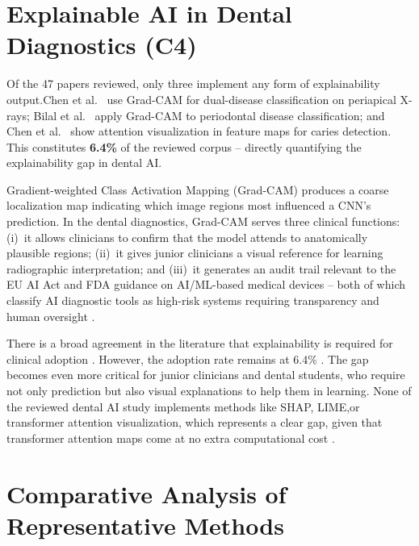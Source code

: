 \documentclass[conference]{IEEEtran}
\begin{document}
\section{Explainable AI in Dental Diagnostics (C4)}
\label{sec:xai}

Of the 47 papers reviewed, only three implement any form of explainability output.Chen et al.~\cite{chen2023deep} use Grad-CAM for dual-disease
classification on periapical X-rays; Bilal et al.~\cite{bilal2024pdcnet}
apply Grad-CAM to periodontal disease classification; and Chen et
al.~\cite{chen2024cariesxrays} show attention visualization in feature
maps for caries detection. This constitutes \textbf{6.4\%} of the
reviewed corpus -- directly quantifying the explainability gap in dental
AI.

Gradient-weighted Class Activation Mapping (Grad-CAM) produces a coarse localization map indicating which image regions most influenced a CNN’s prediction. In the dental diagnostics, Grad-CAM serves three clinical functions:  (i)~it allows clinicians to confirm that the model
attends to anatomically plausible regions; (ii)~it gives junior clinicians a visual reference for learning radiographic interpretation;
and (iii)~it generates an audit trail relevant to the EU AI Act and FDA
guidance on AI/ML-based medical devices -- both of which classify AI
diagnostic tools as high-risk systems requiring transparency and human
oversight \cite{chen2023deep}.

 There is a broad agreement in the literature that explainability is required for clinical adoption
\cite{nassiri2025yolo,gamal2025automated,sastika2025ai,ferrara2025applications}. However, the adoption rate remains at
 6.4\% . The gap becomes even more critical for junior clinicians and dental students, who require not only prediction but also visual explanations to help them in learning. None of the reviewed dental AI study implements methods like SHAP, LIME,or transformer attention visualization, which represents a clear gap, given that transformer attention maps come at no extra computational cost
\cite{bhoopalan2026self}.



\section{Comparative Analysis of Representative Methods}
\label{sec:comparison}
\end{document}
